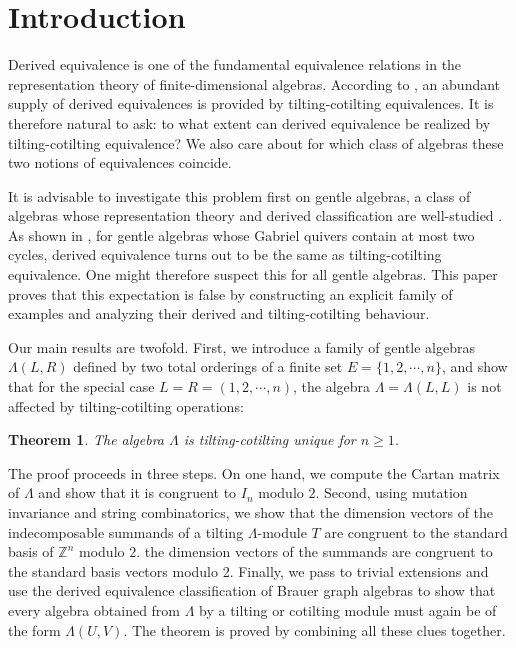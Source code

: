 \documentclass[11pt,reqno]{amsart}
\theoremstyle{plain}
\newtheorem{theorem}{Theorem}[section]
\theoremstyle{definition}
\theoremstyle{remark}
\numberwithin{equation}{section}
\begin{document}
\section{Introduction}
\par Derived equivalence is one of the fundamental equivalence relations in the representation theory of finite-dimensional algebras. According to \cite{Hap}, an abundant supply of derived equivalences is provided by tilting-cotilting equivalences. It is therefore natural to ask: to what extent can derived equivalence be realized by tilting-cotilting equivalence? We also care about for which class of algebras these two notions of equivalences coincide.
\par It is advisable to investigate this problem first on gentle algebras, a class of algebras whose representation theory and derived classification are well-studied \cite{APS}. As shown in \cite{Bob}, for gentle algebras whose Gabriel quivers contain at most two cycles, derived equivalence turns out to be the same as tilting-cotilting equivalence. One might therefore suspect this for all gentle algebras. This paper proves that this expectation is false by constructing an explicit family of examples and analyzing their derived and tilting-cotilting behaviour.
\par Our main results are twofold. First, we introduce a family of gentle algebras $\Lambda(L,R)$ defined by two total orderings of a finite set $E=\{1,2,\cdots,n\}$, and show that for the special case $L=R=(1,2,\cdots,n)$, the algebra $\Lambda=\Lambda(L,L)$ is not affected by tilting-cotilting operations:
\begin{theorem}\label{thm A}
    The algebra $\Lambda$ is tilting-cotilting unique for $n\geq1$.
\end{theorem}
\par The proof proceeds in three steps. On one hand, we compute the Cartan matrix of $\Lambda$ and show that it is congruent to $I_n$ modulo $2$. Second, using mutation invariance and string combinatorics, we show that the dimension vectors of the indecomposable summands of a tilting $\Lambda$-module $T$ are congruent to the standard basis of $\mathbb{Z}^n$ modulo $2$. the dimension vectors of the summands are congruent to the standard basis vectors modulo 2. Finally, we pass to trivial extensions \cite{Ric} and use the derived equivalence classification of Brauer graph algebras \cite{OZ} to show that every algebra obtained from $\Lambda$ by a tilting or cotilting module must again be of the form $\Lambda(U,V)$. The theorem is proved by combining all these clues together.
\end{document}
